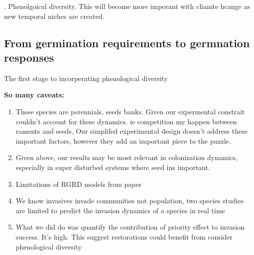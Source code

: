 \documentclass{article}\usepackage[]{graphicx}\usepackage[]{color}
\begin{document}
. Phenolgoical diversity. This will become more imporant with cliamte hcange as new temporal niches are created.
\subsection*{From germination requirements to germnation responses}
The first stage to incorperating phenological diversity


\textbf{So many caveats:}
\begin{enumerate}
\item These species are perennials, seeds banks. Given our expermental constrait couldn't account for these dynamics. ie competition my happen between raments and seeds. Our simplifed experimental design doesn't address these important factors, however they add an important piece to the puzzle. 
\item Given above, our results may be most relevant in colonization dynamics, especially in super disturbed systems where seed ins important.
\item Limitations of RGRD models from paper
\item We know invasives invade communities not population, two species studies are limited to predict the invasion dynamics of a species in real time
\item What we did do was quantify the contribution of priority effect to invasion success. It's high. This suggest restorations could benefit from consider phenological diversity 
\end{enumerate}
\end{document}
